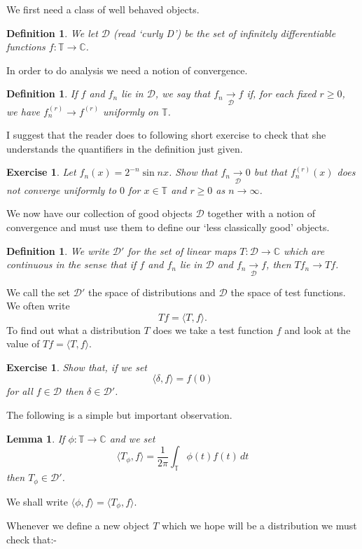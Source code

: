 \documentclass[12pt]{article}
\newtheorem{lemma}[theorem]{Lemma}
\newtheorem{definition}[theorem]{Definition}
\newtheorem{exercise}[theorem]{Exercise}
\theoremstyle{definition}
\newcommand{\arrowD}{\underset{\mathcal D}{\rightarrow}}
\begin{document}
We first need a class of well behaved objects.
\begin{definition} We let ${\mathcal D}$
(read `curly D') be the set of infinitely differentiable
functions $f:{\mathbb T}\rightarrow{\mathbb C}$.
\end{definition}
In order to do analysis we need a notion of convergence.
\begin{definition} If $f$ and $f_{n}$ lie in
${\mathcal D}$, we say that $f_{n}\arrowD f$
if, for each fixed $r\geq 0$, we have $f_{n}^{(r)}\rightarrow f^{(r)}$
uniformly on ${\mathbb T}$.
\end{definition}
I suggest that the reader does to following short exercise
to check that she understands the quantifiers in the
definition just given.
\begin{exercise} Let $f_{n}(x)=2^{-n}\sin nx$. Show
that $f_{n}\arrowD 0$ but that $f_{n}^{(r)}(x)$ does not
converge uniformly to $0$ for $x\in {\mathbb T}$
and $r\geq 0$ as $n\rightarrow\infty$.
\end{exercise}

We now have our collection of good objects ${\mathcal D}$
together with a notion of convergence and must use them to
define our `less classically good' objects.
\begin{definition} We write ${\mathcal D}'$
for the set of linear maps $T:{\mathcal D}\rightarrow{\mathbb C}$
which are continuous in the sense that
if $f$ and $f_{n}$ lie in
${\mathcal D}$ and $f_{n}\arrowD f$,
then $Tf_{n}\rightarrow Tf$.
\end{definition}
We call the set ${\mathcal D}'$ the space of distributions
and ${\mathcal D}$ the space of test functions. We
often write
\[Tf=\langle T,f\rangle.\]
To find out what a distribution $T$ does we take
a test function $f$ and look at the value of
$Tf=\langle T,f\rangle$.
\begin{exercise} Show that, if we set
\[\langle \delta,f\rangle=f(0)\]
for all $f\in{\mathcal D}$ then $\delta\in{\mathcal D}'$.
\end{exercise}
The following is a simple but important observation.
\begin{lemma}\label{smooth distributions}
If $\phi:{\mathbb T}\rightarrow {\mathbb C}$
and we set
\[\langle T_{\phi},f\rangle=
\frac{1}{2\pi}\int_{\mathbb T}\phi(t) f(t)\,dt \]
then $T_{\phi}\in{\mathcal D}'$.
\end{lemma}
We shall write $\langle \phi,f\rangle=\langle T_{\phi},f\rangle$.

Whenever we define a new object $T$ which we hope
will be a distribution we must check that:-
\end{document}
